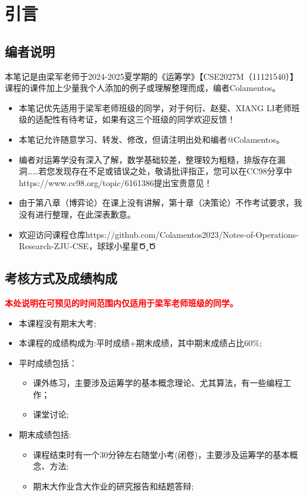 \ifx\allfiles\undefined

	
	
\else
\fi
    \chapter{引言}
	\section{编者说明}
	本笔记是由梁军老师于2024-2025夏学期的《运筹学》【CSE2027M（11121540）】课程的课件加上少量我个人添加的例子或理解整理而成，编者Colamentos。
	\begin{itemize}
		\item 本笔记优先适用于梁军老师班级的同学，对于何衍、赵斐、XIANG LI老师班级的适配性有待考证，如果有这三个班级的同学欢迎反馈！
		\item 本笔记允许随意学习、转发、修改，但请注明出处和编者@Colamentos。
		\item 编者对运筹学没有深入了解，数学基础较差，整理较为粗糙，排版存在漏洞……若您发现存在不足或错误之处，敬请批评指正，您可以在CC98分享中https://www.cc98.org/topic/6161386提出宝贵意见！
		\item 由于第八章（博弈论）在课上没有讲解，第十章（决策论）不作考试要求，我没有进行整理，在此深表歉意。
		\item 欢迎访问课程仓库https://github.com/Colamentos2023/Notes-of-Operations-Research-ZJU-CSE，球球小星星Ծ‸Ծ
	\end{itemize}
	\section{考核方式及成绩构成}
	\textcolor{red}{\textbf{本处说明在可预见的时间范围内仅适用于梁军老师班级的同学。}}
	\begin{itemize}
	\item 本课程没有期末大考;
	\item 本课程的成绩构成为:平时成绩+期末成绩，其中期末成绩占比60\%;
	\item 平时成绩包括：
	\begin{itemize}
		\item 课外练习，主要涉及运筹学的基本概念理论、尤其算法，有一些编程工作；
		\item 课堂讨论;
	\end{itemize}
	\item 期末成绩包括:
	\begin{itemize}
		\item 课程结束时有一个30分钟左右随堂小考(闭卷)，主要涉及运筹学的基本概念、方法;
		\item 期末大作业含大作业的研究报告和结题答辩;
	\end{itemize}
	\end{itemize}

